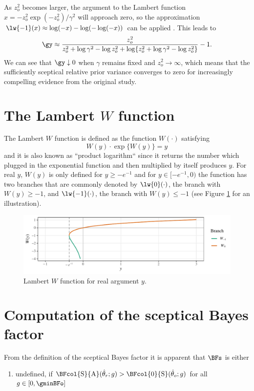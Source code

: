 \begin{subappendices}
As $z_{o}^{2}$ becomes larger, the argument to the Lambert function
$x = -z_{o}^{2}\exp(-z_{o}^{2})/\gamma^{2}$ will approach zero, so the
approximation $\lw{-1}(x) \approx \log(-x) - \log(-\log(-x))$ can be applied
\citep[p. 350]{Corless1996}. This leads to
\begin{align*}
  \gy \approx \frac{z_{o}^{2}}{z_{o}^{2} + \log \gamma^{2} - \log z_{o}^{2} +
  \log\{z_{o}^{2} + \log \gamma^{2} - \log z_{o}^{2}\}} - 1.
\end{align*}
We can see that $\gy \downarrow 0$ when $\gamma$ remains fixed and
$z_{o}^{2} \to \infty$, which means that the sufficiently sceptical relative
prior variance converges to zero for increasingly compelling evidence from the
original study.

\section{The Lambert $W$ function}
\label{appendix:lambertW}
The Lambert $W$ function \citep{Corless1996} is defined as the function
$W(\cdot)$ satisfying
$$W(y) \cdot \exp\{W(y)\} = y$$
and it is also known as ``product logarithm`` since it returns the number which
plugged in the exponential function and then multiplied by itself produces $y$.
For real $y$, $W(y)$ is only defined for $y \geq - e^{-1}$ and for
$y \in [-e^{-1}, 0)$ the function has two branches that are commonly denoted by
$\lw{0}(\cdot)$, the branch with $W(y) \geq -1$, and $\lw{-1}(\cdot)$, the
branch with $W(y) \leq -1$ (see Figure \ref{fig:lambertW} for an illustration).
\begin{figure}[!htb]
\begin{knitrout}
\color{fgcolor}
\includegraphics[width=\maxwidth]{images/paper1/plot-Lambert-1}
\end{knitrout}
\caption{Lambert $W$ function for real argument $y$.}
\label{fig:lambertW}
\end{figure}


\section{Computation of the sceptical Bayes factor}
\label{appendix:bfs}
From the definition of the sceptical Bayes factor it is apparent that $\BFs$ is
either
\begin{enumerate}
  \item \label{undef} undefined,
  if
  $\BFcol{\text{S}}{\text{A}}(\hat{\theta}_r; g) >
  \BFcol{\text{0}}{\text{S}}(\hat{\theta}_o; g)$ for all $g \in [0,
    \gminBFo]$


\end{enumerate}
\end{subappendices}
